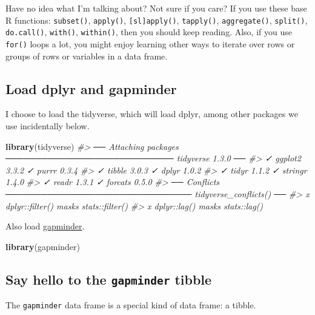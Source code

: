 \documentclass[
]{book}
\newenvironment{Shaded}{\begin{snugshade}}{\end{snugshade}}
\newcommand{\CommentTok}[1]{\textcolor[rgb]{0.56,0.35,0.01}{\textit{#1}}}
\newcommand{\KeywordTok}[1]{\textcolor[rgb]{0.13,0.29,0.53}{\textbf{#1}}}
\newcommand{\NormalTok}[1]{#1}
\begin{document}
Have no idea what I'm talking about? Not sure if you care? If you use these base R functions: \texttt{subset()}, \texttt{apply()}, \texttt{{[}sl{]}apply()}, \texttt{tapply()}, \texttt{aggregate()}, \texttt{split()}, \texttt{do.call()}, \texttt{with()}, \texttt{within()}, then you should keep reading. Also, if you use \texttt{for()} loops a lot, you might enjoy learning other ways to iterate over rows or groups of rows or variables in a data frame.

\hypertarget{load-dplyr-and-gapminder}{%
\subsection{Load dplyr and gapminder}\label{load-dplyr-and-gapminder}}

I choose to load the tidyverse, which will load dplyr, among other packages we use incidentally below.

\begin{Shaded}
\begin{Highlighting}[]
\KeywordTok{library}\NormalTok{(tidyverse)}
\CommentTok{#> ── Attaching packages ──────────────────────────── tidyverse 1.3.0 ──}
\CommentTok{#> ✓ ggplot2 3.3.2     ✓ purrr   0.3.4}
\CommentTok{#> ✓ tibble  3.0.3     ✓ dplyr   1.0.2}
\CommentTok{#> ✓ tidyr   1.1.2     ✓ stringr 1.4.0}
\CommentTok{#> ✓ readr   1.3.1     ✓ forcats 0.5.0}
\CommentTok{#> ── Conflicts ─────────────────────────────── tidyverse_conflicts() ──}
\CommentTok{#> x dplyr::filter() masks stats::filter()}
\CommentTok{#> x dplyr::lag()    masks stats::lag()}
\end{Highlighting}
\end{Shaded}

Also load \href{https://github.com/jennybc/gapminder}{gapminder}.

\begin{Shaded}
\begin{Highlighting}[]
\KeywordTok{library}\NormalTok{(gapminder)}
\end{Highlighting}
\end{Shaded}

\hypertarget{say-hello-to-the-gapminder-tibble}{%
\subsection{\texorpdfstring{Say hello to the \texttt{gapminder} tibble}{Say hello to the gapminder tibble}}\label{say-hello-to-the-gapminder-tibble}}

The \texttt{gapminder} data frame is a special kind of data frame: a tibble.
\end{document}
